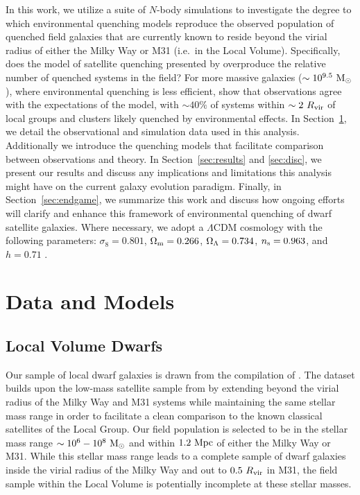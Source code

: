 \documentclass[usenatbib]{mnras}
\newcommand{\rvir}{R_{\rm vir}}
\newcommand{\msun}{{\rm M}_{\odot}}
\begin{document}
In this work, we utilize a suite of $N$-body simulations to investigate the
degree to which environmental quenching models reproduce the observed
population of quenched field galaxies that are currently known to
reside beyond the virial radius of either the Milky Way or M31
(i.e.~in the Local Volume). 
%
Specifically, does the model of satellite quenching presented by
\citet{fham15, fham16} overproduce the relative number of quenched
systems in the field? 
%
For more massive galaxies ($\sim10^{9.5}~\msun$), where environmental
quenching is less efficient, \citet{wetzel14} show that observations
agree with the expectations of the model, with $\sim40\%$
of systems within $\sim2~\rvir$ of local groups and clusters likely
quenched by environmental effects.
%
In Section~\ref{sec:data}, we detail the observational and simulation
data used in this analysis. Additionally we introduce the quenching
models that facilitate comparison between observations and theory.
%
In Section~\ref{sec:results} and \ref{sec:disc}, we present our
results and discuss any implications and limitations this analysis
might have on the current galaxy evolution paradigm.
%
Finally, in Section~\ref{sec:endgame}, we summarize this work and
discuss how ongoing efforts will clarify and enhance this framework of
environmental quenching of dwarf satellite galaxies.
%
Where necessary, we adopt a $\Lambda$CDM cosmology with the following
parameters: $\sigma_{8}=0.801$, $\Omega_{\rm m}=0.266$,
$\Omega_{\rm \Lambda}=0.734$, $n_{\rm s}=0.963$, and
$h=0.71$ \citep[WMAP7,][]{larson11}. 




\section{Data and Models}
\label{sec:data}

\subsection{Local Volume Dwarfs}
\label{subsec:obsdata}

Our sample of local dwarf galaxies is drawn from the compilation of
\citet{mcconnachie12}. The dataset builds upon the low-mass satellite sample
from \citet{fham15} by extending beyond the virial radius of the Milky Way and
M31 systems while maintaining the same stellar mass range in order to facilitate
a clean comparison to the known classical satellites of the Local Group.
%
Our field population is selected to be in the stellar mass range
$\sim 10^{6}-10^{8}~\msun$ and within $1.2~{\rm Mpc}$ of either the Milky Way or
M31.
While this stellar mass range leads to a complete sample of dwarf galaxies
inside the virial radius of the Milky Way and out to $0.5~R_{\rm vir}$ in M31,
the field sample within the Local Volume is potentially incomplete at these
stellar masses.
%
\end{document}
